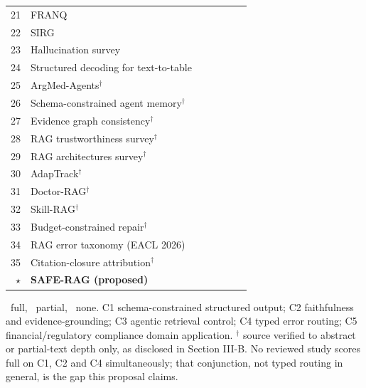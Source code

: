 \documentclass[10pt,twocolumn,letterpaper]{article}
\newcommand{\FU}{\CIRCLE}
\newcommand{\PA}{\LEFTcircle}
\newcommand{\NO}{\Circle}
\begin{document}
\begin{table}[!t]
\begin{tabular}{@{}rp{3.55cm}ccccc@{}}
21 & FRANQ \cite{franq} & \NO & \FU & \NO & \NO & \NO \\
22 & SIRG \cite{sirg} & \NO & \FU & \NO & \NO & \NO \\
23 & Hallucination survey \cite{hallsurvey} & \NO & \FU & \NO & \PA & \NO \\
24 & Structured decoding for text-to-table \cite{text2table} & \FU & \NO & \NO & \NO & \NO \\
25 & ArgMed-Agents$^{\dagger}$ \cite{argmed} & \NO & \PA & \PA & \NO & \NO \\
26 & Schema-constrained agent memory$^{\dagger}$ \cite{agentmem} & \FU & \NO & \PA & \NO & \NO \\
27 & Evidence graph consistency$^{\dagger}$ \cite{evgraph} & \NO & \FU & \NO & \NO & \NO \\
28 & RAG trustworthiness survey$^{\dagger}$ \cite{trustsurvey} & \NO & \FU & \PA & \NO & \NO \\
29 & RAG architectures survey$^{\dagger}$ \cite{archsurvey} & \NO & \PA & \PA & \NO & \NO \\
30 & AdapTrack$^{\dagger}$ \cite{adaptrack} & \FU & \NO & \NO & \NO & \NO \\
31 & Doctor-RAG$^{\dagger}$ \cite{doctorrag} & \NO & \PA & \FU & \FU & \NO \\
32 & Skill-RAG$^{\dagger}$ \cite{skillrag} & \NO & \NO & \FU & \FU & \NO \\
33 & Budget-constrained repair$^{\dagger}$ \cite{budgetrepair} & \NO & \FU & \FU & \FU & \NO \\
34 & RAG error taxonomy (EACL 2026) \cite{ragerrors} & \NO & \FU & \NO & \PA & \NO \\
35 & Citation-closure attribution$^{\dagger}$ \cite{refwalk} & \FU & \FU & \PA & \NO & \FU \\
\hline
$\star$ & \textbf{SAFE-RAG (proposed)} & \FU & \FU & \FU & \FU & \FU \\
\hline
\end{tabular}

\vspace{3pt}
{\scriptsize \FU\ full, \PA\ partial, \NO\ none. C1 schema-constrained structured output; C2 faithfulness and evidence-grounding; C3 agentic retrieval control; C4 typed error routing; C5 financial/regulatory compliance domain application. $^{\dagger}$ source verified to abstract or partial-text depth only, as disclosed in Section III-B. No reviewed study scores full on C1, C2 and C4 simultaneously; that conjunction, not typed routing in general, is the gap this proposal claims.}
\end{table}
\end{document}
